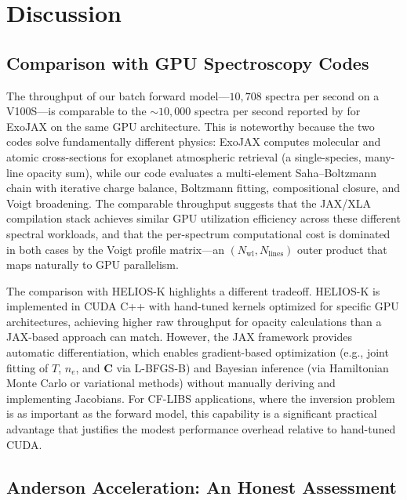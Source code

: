\section{Discussion}
\label{sec:discussion}

\subsection{Comparison with GPU Spectroscopy Codes}

The throughput of our batch forward model---$10{,}708$ spectra per second on a V100S---is
comparable to the $\sim 10{,}000$ spectra per second reported by \citet{Kawahara2022} for ExoJAX on the same GPU architecture.
This is noteworthy because the two codes solve fundamentally different physics: ExoJAX computes molecular and atomic cross-sections for exoplanet atmospheric retrieval (a single-species, many-line opacity sum), while our code evaluates a multi-element Saha--Boltzmann chain with iterative charge balance, Boltzmann fitting, compositional closure, and Voigt broadening.
The comparable throughput suggests that the JAX/XLA compilation stack achieves similar GPU utilization efficiency across these different spectral workloads, and that the per-spectrum computational cost is dominated in both cases by the Voigt profile matrix---an $(N_\mathrm{wl}, N_\mathrm{lines})$ outer product that maps naturally to GPU parallelism.

The comparison with HELIOS-K \citep{Grimm2021} highlights a different tradeoff.
HELIOS-K is implemented in CUDA C++ with hand-tuned kernels optimized for specific GPU architectures, achieving higher raw throughput for opacity calculations than a JAX-based approach can match.
However, the JAX framework provides automatic differentiation, which enables gradient-based optimization (e.g., joint fitting of $T$, $n_e$, and $\bm{C}$ via L-BFGS-B) and Bayesian inference (via Hamiltonian Monte Carlo or variational methods) without manually deriving and implementing Jacobians.
For CF-LIBS applications, where the inversion problem is as important as the forward model, this capability is a significant practical advantage that justifies the modest performance overhead relative to hand-tuned CUDA.

\subsection{Anderson Acceleration: An Honest Assessment}

